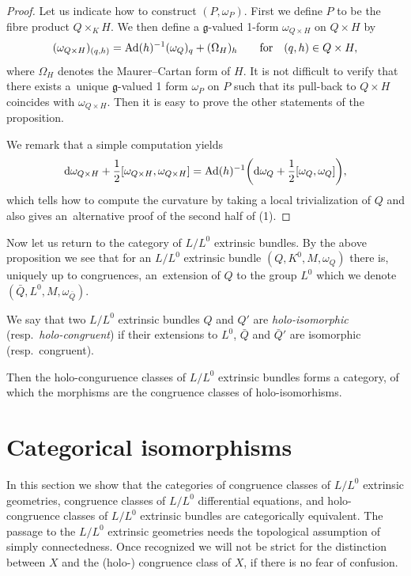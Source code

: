 \documentclass[pdftex]{sigma}%
\newcommand{\g}{\mathfrak g}
\numberwithin{equation}{section}
\begin{document}
\begin{proof} Let us indicate how to construct $(P, \omega_P)$.
First we define $P$ to be the fibre product
$Q\times _K H $. We then define a $\g$-valued 1-form $\omega_{Q\times H}$
on $Q\times H$ by
\[
 ( \omega_{Q \times H} ) _{(q, h)} = {\rm Ad}(h) ^{-1} (\omega_Q)_q + (\Omega _H )_h \qquad \text{for}\quad (q, h) \in Q\times H,
\]
where $\Omega_H$ denotes the Maurer--Cartan form of $H$. It is not difficult to verify that there exists a~unique $\g$-valued 1 form
$\omega_P$ on $P$ such that its pull-back to $Q\times H$ coincides with
$\omega_{Q\times H}$. Then it is easy to prove the other statements of the proposition.

We remark that a simple computation yields
\[
{\rm d}\omega_{Q\times H} +\frac12 [ \omega_{Q\times H}, \omega_{Q\times H} ]
={\rm Ad}(h)^{-1} \bigg({\rm d}\omega_Q +\frac12[\omega_Q, \omega_Q]\bigg),
\]
which tells how to compute the curvature by taking a local trivialization of $Q$ and also gives an~alternative proof of the second half of (1).
\end{proof}


Now let us return to the category of $L/L^0$ extrinsic bundles.
By the above proposition we see that for an $L/L^0$ extrinsic bundle $\left(Q, K^0, M, \omega_Q\right)$ there is, uniquely up to congruences, an~extension of $Q$ to the group
$L^0$ which we denote $\left(\bar Q, L^0, M, \omega_{\bar Q}\right)$.

We say that two $L/ L^0$ extrinsic bundles $Q$ and $Q'$ are
\emph{holo-isomorphic} (resp.\ \emph{holo-congruent}) if their extensions to $L^0$, $\bar Q$ and $\bar Q'$ are isomorphic (resp.\ congruent).

Then the holo-conguruence classes of $L/L^0$ extrinsic bundles
forms a category, of which the morphisms are the congruence classes of
holo-isomorhisms.\vspace{-1.5mm}


\section{Categorical isomorphisms}
\label{sec4}

In this section we show that the categories of congruence classes of $L/L^0$ extrinsic geometries, congruence classes of $L/L^0$ differential equations, and holo-congruence classes of $L/L^0$ extrinsic bundles are categorically equivalent. The passage to the $L/L^0$ extrinsic geometries needs the topological assumption of simply connectedness. Once recognized we will not be strict for the distinction between $X$ and the (holo-) congruence class of $X$, if there is no fear of confusion.
\vspace{-1mm}
\end{document}

